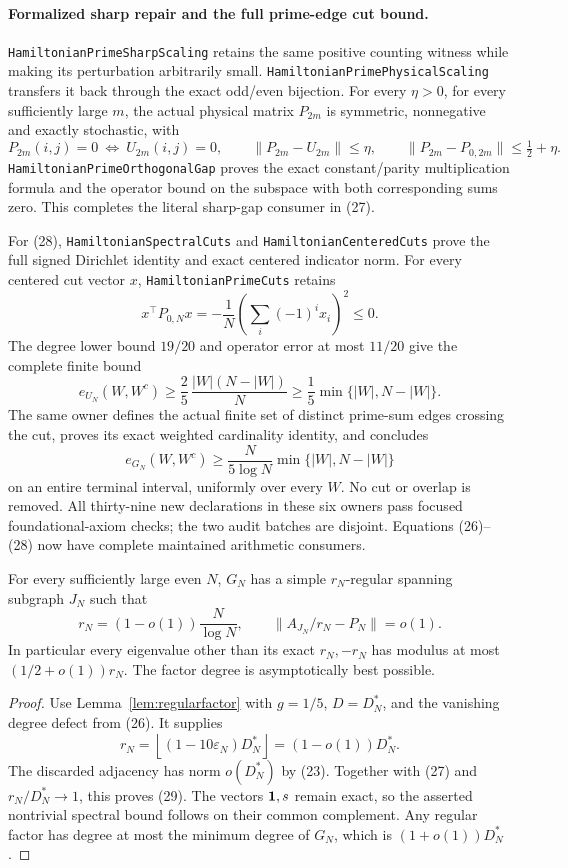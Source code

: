 \paragraph{Formalized sharp repair and the full prime-edge cut bound.}
\texttt{HamiltonianPrimeSharpScaling} retains the same positive
counting witness while making its perturbation arbitrarily small.
\texttt{HamiltonianPrimePhysicalScaling} transfers it back through
the exact odd/even bijection. For every \(\eta>0\), for every
sufficiently large \(m\), the actual physical matrix \(P_{2m}\)
is symmetric, nonnegative and exactly stochastic, with
\[
 P_{2m}(i,j)=0\ \Longleftrightarrow\ U_{2m}(i,j)=0,\qquad
 \|P_{2m}-U_{2m}\|\leq\eta,\qquad
 \|P_{2m}-P_{0,2m}\|\leq\tfrac12+\eta .
\]
\texttt{HamiltonianPrimeOrthogonalGap} proves the exact
constant/parity multiplication formula and the operator bound
on the subspace with both corresponding sums zero.
This completes the literal sharp-gap consumer in (27).

For (28), \texttt{HamiltonianSpectralCuts} and
\texttt{HamiltonianCenteredCuts} prove the full signed
Dirichlet identity and exact centered indicator norm.
For every centered cut vector \(x\),
\texttt{HamiltonianPrimeCuts} retains
\[
 x^\top P_{0,N}x=-\frac1N
       \left(\sum_i(-1)^i x_i\right)^2\leq0.
\]
The degree lower bound \(19/20\) and operator error at most
\(11/20\) give the complete finite bound
\[
 e_{U_N}(W,W^c)\geq\frac25\,\frac{|W|(N-|W|)}N
                       \geq\frac15\min\{|W|,N-|W|\}.
\]
The same owner defines the actual finite set of distinct
prime-sum edges crossing the cut, proves its exact weighted
cardinality identity, and concludes
\[
 e_{G_N}(W,W^c)\geq\frac{N}{5\log N}
                           \min\{|W|,N-|W|\}
\]
on an entire terminal interval, uniformly over every \(W\).
No cut or overlap is removed. All thirty-nine new declarations
in these six owners pass focused foundational-axiom checks;
the two audit batches are disjoint. Equations (26)--(28)
now have complete maintained arithmetic consumers.

\begin{theorem}
\label{thm:nearlyoptimalfactor}
For every sufficiently large even \(N\), \(G_N\) has a simple
\(r_N\)-regular spanning subgraph \(J_N\) such that
\[
 r_N=(1-o(1))\frac N{\log N},\qquad
 \|A_{J_N}/r_N-P_N\|=o(1).
 \tag{29}
\]
In particular every eigenvalue other than its exact
\(r_N,-r_N\) has modulus at most \((1/2+o(1))r_N\).
The factor degree is asymptotically best possible.
\end{theorem}
\begin{proof}
Use Lemma~\ref{lem:regularfactor} with \(g=1/5\),
\(D=D_N^*\), and the vanishing degree defect from (26).
It supplies
\[
 r_N=\left\lfloor(1-10\varepsilon_N)D_N^*\right\rfloor
                      =(1-o(1))D_N^* .
\]
The discarded adjacency has norm \(o(D_N^*)\) by (23).
Together with (27) and \(r_N/D_N^*\to1\), this proves (29).
The vectors \(\mathbf1,s\) remain exact, so the asserted
nontrivial spectral bound follows on their common complement.
Any regular factor has degree at most the minimum degree of
\(G_N\), which is \((1+o(1))D_N^*\).
\end{proof}

